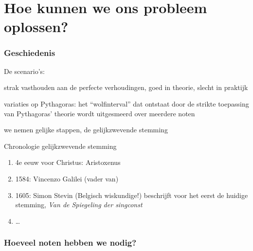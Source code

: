 \documentclass[compress, darktitle, framenumber, totalframenumber, handout]{beamer}
\begin{document}
\section{Hoe kunnen we ons probleem oplossen?}
\begin{frame}
  \frametitle{Geschiedenis}

  De scenario's:
  \begin{description}[middeleeuwen]
    \item[Pythagoras] strak vasthouden aan de perfecte verhoudingen, goed in theorie, slecht in praktijk
    \item[middeleeuwen] variaties op Pythagoras: het ``wolfinterval'' dat ontstaat door de strikte toepassing van Pythagoras' theorie wordt uitgesmeerd over meerdere noten
    \item[hedendaags] we nemen gelijke stappen, de \alert{gelijkzwevende stemming}
  \end{description}
  \pause
  \begin{block}{Chronologie gelijkzwevende stemming}
    \begin{enumerate}
      \item 4e eeuw voor Christus: Aristoxenus
      \item 1584: Vincenzo Galilei (vader van)
      \item 1605: Simon Stevin (Belgisch wiskundige!) beschrijft voor het eerst de huidige stemming, \emph{Van de Spiegeling der singconst}
      \item \ldots
    \end{enumerate}
  \end{block}
\end{frame}

\begin{frame}
  \frametitle{Hoeveel noten hebben we nodig?}

  \begin{center}
  \end{center}
\end{frame}
\end{document}
